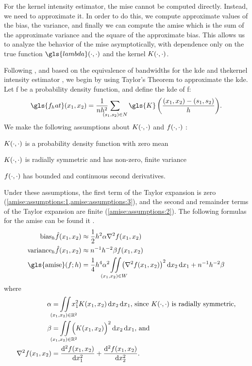 For the \gls{kernel intensity estimator},
the \gls{mise} cannot be computed directly.
Instead,
we need to approximate it.
In order to do this,
we compute approximate values of the bias,
the variance,
and finally we can compute the \gls{amise} which is the sum of the approximate variance and the square of the approximate bias.
This allows us to analyze the behavior of the \gls{mise} asymptotically,
with dependence only on the true function $\gls{lambda}\dotdot$ and the kernel $K(\cdot, \cdot)$.

Following \citep{silverman1986density,wand1994kernel},
and based on the equivalence of bandwidths for the \gls{kde} and the\gls{kernel intensity estimator} \citep{diggle1988equivalence},
we begin by using Taylor's Theorem to approximate the \gls{kde}.
Let \gls{f} be a probability density function,
and define the \gls{kde} of \gls{f}:
\begin{equation}
    \gls{f_hat} \xvec%
            = \sumSn{\gls{K}\left( \frac{\xvec-(s_1, s_2)}{h} \right)} \text{.}%
\end{equation}
We make the following assumptions about $K(\cdot, \cdot)$
and $f(\cdot, \cdot)$ \citep{silverman1986density,wand1994kernel}:
\begin{assumptions}
    \item $K(\cdot, \cdot)$ is a probability density function with zero mean \label{amise:assumptions:1}
    \item $K(\cdot, \cdot)$ is radially symmetric and has non-zero, finite variance \label{amise:assumptions:2}
    \item $f(\cdot, \cdot)$ has bounded and continuous second derivatives. \label{amise:assumptions:3}
\end{assumptions}

Under these assumptions,
the first term of the Taylor expansion is zero (\cref{amise:assumptions:1,amise:assumptions:3}),
and the second and remainder terms of the Taylor expansion are finite (\cref{amise:assumptions:2}).
The following formulas for the \gls{amise} can be found it \citet[Section 4.3]{silverman1986density}.
\begin{align}
    \mbox{bias}_h \hat{f} \xvec%
        & \approx \frac{1}{2} h^{2} \alpha \nabla^2 f \xvec \nonumber \\%
    \mbox{variance}_h \hat{f} \xvec%
        & \approx n^{-1} h^{-2} \beta f \xvec \nonumber \\%
    \mbox{\gls{amise}}(f; h)%
        & = \frac{1}{4} h^{4} \alpha^2 \iintW{\left( \nabla^2 f \xvec \right)^2 }%
            + n^{-1} h^{-2} \beta \label{eq:amisef}%
\end{align}
where
\begin{align}
    \alpha & = \iintR{x_1^2 K(x_1,x_2)} \text{, since}~K\dotdot~\text{is radially symmetric,} \nonumber \\
    \beta & = \iintR{\Big( K(x_1,x_2) \Big)^2} \text{, and} \nonumber \\
    \nabla^2 f \xvec & = \frac{\diffsq{f}\xvec}{\diff{x_1^2}} + \frac{\diffsq{f}\xvec}{\diff{x_2^2}} \nonumber \text{.}
\end{align}

